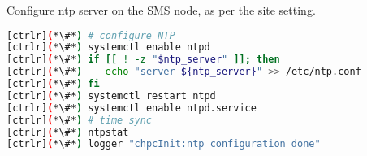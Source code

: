 	Configure ntp server on the SMS node, as per the site setting.


\begin{lstlisting}[language=bash,keywords={}]
[ctrlr](*\#*) # configure NTP
[ctrlr](*\#*) systemctl enable ntpd
[ctrlr](*\#*) if [[ ! -z "$ntp_server" ]]; then
[ctrlr](*\#*)    echo "server ${ntp_server}" >> /etc/ntp.conf
[ctrlr](*\#*) fi
[ctrlr](*\#*) systemctl restart ntpd
[ctrlr](*\#*) systemctl enable ntpd.service
[ctrlr](*\#*) # time sync
[ctrlr](*\#*) ntpstat
[ctrlr](*\#*) logger "chpcInit:ntp configuration done"
\end{lstlisting} 

